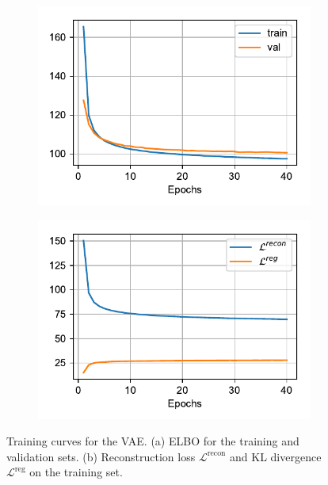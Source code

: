 \documentclass{article}
\begin{document}
\begin{figure}[t]
\begin{subfigure}{0.49\textwidth}
\centering
\includegraphics[scale=0.72]{img/elbo.pdf}
\caption{}
\label{fig:vae_curves_a}
\end{subfigure}
\begin{subfigure}{0.49\textwidth}
\centering
\includegraphics[scale=0.72]{img/recon_reg_losses.pdf}
\caption{}
\label{fig:vae_curves_b}
\end{subfigure}
 \caption{Training curves for the VAE. (a) ELBO for the training and validation sets. (b) Reconstruction loss $\mathcal{L}^{\text{recon}}$ and KL divergence $\mathcal{L}^{\text{reg}}$ on the training set.}
\label{fig:vae_curves}
\end{figure}
\end{document}

